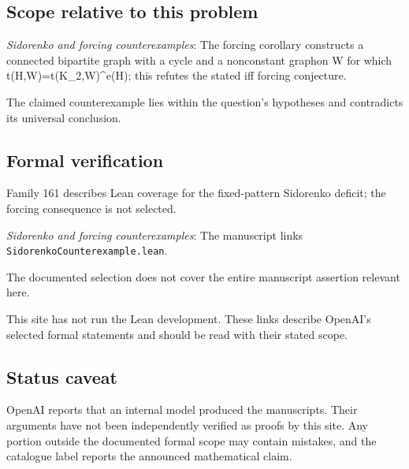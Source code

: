 \documentclass[11pt]{article}
\begin{document}
\subsection{Scope relative to this problem}
\textit{Sidorenko and forcing counterexamples}: The forcing corollary constructs a connected bipartite graph with a cycle and a nonconstant graphon W for which t(H,W)=t(K\_2,W)\textasciicircum{}e(H); this refutes the stated iff forcing conjecture.

The claimed counterexample lies within the question’s hypotheses and contradicts its universal conclusion.

\subsection{Formal verification}
Family 161 describes Lean coverage for the fixed-pattern Sidorenko deficit; the forcing consequence is not selected.

\textit{Sidorenko and forcing counterexamples}: The manuscript links \texttt{SidorenkoCounterexample.lean}.

The documented selection does not cover the entire manuscript assertion relevant here.

This site has not run the Lean development. These links describe OpenAI’s selected formal statements and should be read with their stated scope.

\subsection{Status caveat}
OpenAI reports that an internal model produced the manuscripts. Their arguments have not been independently verified as proofs by this site. Any portion outside the documented formal scope may contain mistakes, and the catalogue label reports the announced mathematical claim.
\end{document}
